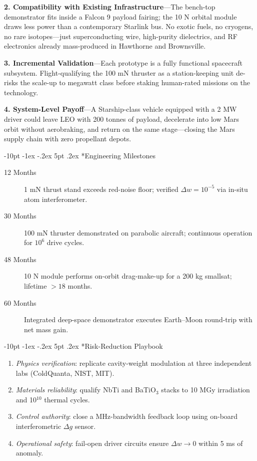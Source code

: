 \documentclass[12pt,letterpaper]{book}
\makeatletter
\renewcommand\section{\@startsection{section}{1}{\z@}%
  {-8pt \@plus -1ex \@minus -.2ex}%
  {4pt \@plus.2ex}%
  {\normalfont\large\bfseries}}
\renewcommand\section{\@startsection {section}{1}{\z@}%
                {-10pt \@plus -1ex \@minus -.2ex}%
                {5pt \@plus.2ex}%
                {\normalfont\large\bfseries}}
\makeatother
\begin{document}
\textbf{2. Compatibility with Existing Infrastructure}\;—The bench-top demonstrator fits inside a Falcon 9 payload fairing; the 10 N orbital module draws less power than a contemporary Starlink bus.  No exotic fuels, no cryogens, no rare isotopes—just superconducting wire, high-purity dielectrics, and RF electronics already mass-produced in Hawthorne and Brownsville.

\textbf{3. Incremental Validation}\;—Each prototype is a fully functional spacecraft subsystem.  Flight-qualifying the 100 mN thruster as a station-keeping unit de-risks the scale-up to megawatt class before staking human-rated missions on the technology.

\textbf{4. System-Level Payoff}\;—A Starship-class vehicle equipped with a 2 MW driver could leave LEO with 200 tonnes of payload, decelerate into low Mars orbit without aerobraking, and return on the same stage—closing the Mars supply chain with zero propellant depots.

\section*{Engineering Milestones}
\begin{description}
  \item[12 Months] 1 mN thrust stand exceeds red-noise floor; verified $\Delta w=10^{-5}$ via in-situ atom interferometer.
  \item[30 Months] 100 mN thruster demonstrated on parabolic aircraft; continuous operation for $10^6$ drive cycles.
  \item[48 Months] 10 N module performs on-orbit drag-make-up for a 200 kg smallsat; lifetime $>18$ months.
  \item[60 Months] Integrated deep-space demonstrator executes Earth–Moon round-trip with net mass gain.
\end{description}

\section*{Risk-Reduction Playbook}
\begin{enumerate}
  \item \emph{Physics verification}: replicate cavity-weight modulation at three independent labs (ColdQuanta, NIST, MIT).
  \item \emph{Materials reliability}: qualify NbTi and BaTiO$_3$ stacks to 10 MGy irradiation and 10$^{10}$ thermal cycles.
  \item \emph{Control authority}: close a MHz-bandwidth feedback loop using on-board interferometric $\Delta g$ sensor.
  \item \emph{Operational safety}: fail-open driver circuits ensure $\Delta w\!\rightarrow\!0$ within 5 ms of anomaly.
\end{enumerate}
\end{document}
